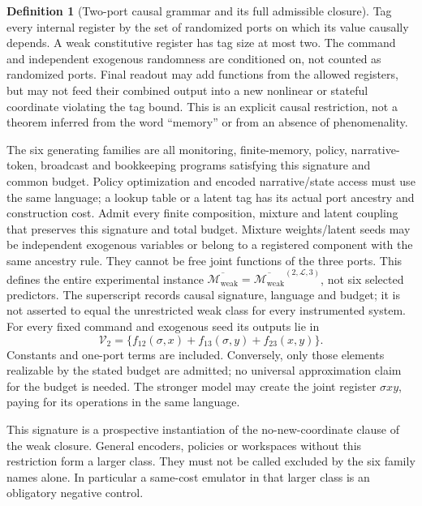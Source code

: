 \documentclass[11pt,a4paper]{article}
\theoremstyle{definition}
\newtheorem{definition}[theorem]{Definition}
\newcommand{\WeakFam}{\mathcal{M}_{\mathrm{weak}}}
\newcommand{\WeakClosure}{\overline{\WeakFam}}
\begin{document}
\begin{definition}[Two-port causal grammar and its full admissible closure]
Tag every internal register by the set of randomized ports on which its value
causally depends. A weak constitutive register has tag size at most two.
The command and independent exogenous randomness are conditioned on, not
counted as randomized ports. Final readout may add functions from the allowed
registers, but may not feed their combined output into a new nonlinear or
stateful coordinate violating the tag bound. This is an explicit causal
restriction, not a theorem inferred from the word ``memory'' or from an
absence of phenomenality.

The six generating families are all monitoring, finite-memory, policy,
narrative-token, broadcast and bookkeeping programs satisfying this signature
and common budget. Policy optimization and encoded narrative/state access
must use the same language; a lookup table or a latent tag has its actual
port ancestry and construction cost. Admit every finite composition, mixture
and latent coupling that preserves this signature and total budget. Mixture
weights/latent seeds may be independent exogenous variables or belong to a
registered component with the same ancestry rule. They cannot be free joint
functions of the three ports. This defines the entire experimental instance
$\WeakClosure=\WeakClosure^{(2,\mathcal L,3)}$, not six selected predictors.
The superscript records causal signature, language and budget; it is not
asserted to equal the unrestricted weak class for every instrumented system.
For every fixed command and
exogenous seed its outputs lie in
\[
 \mathcal V_2=\{f_{12}(\sigma,x)+f_{13}(\sigma,y)+f_{23}(x,y)\}.
\]
Constants and one-port terms are included. Conversely, only those elements
realizable by the stated budget are admitted; no universal approximation
claim for the budget is needed. The stronger model may create the joint
register $\sigma xy$, paying for its operations in the same language.

This signature is a prospective instantiation of the no-new-coordinate clause
of the weak closure. General encoders, policies or workspaces without this
restriction form a larger class. They must not be called excluded by the
six family names alone. In particular a same-cost emulator in that larger
class is an obligatory negative control.
\end{definition}
\end{document}
